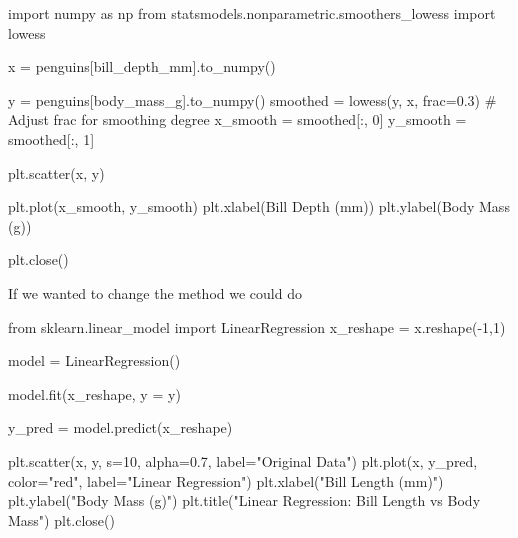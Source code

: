 \documentclass[
  letterpaper,
  DIV=11,
  numbers=noendperiod]{scrreprt}
\newenvironment{Shaded}{\begin{snugshade}}{\end{snugshade}}
\newcommand{\CommentTok}[1]{\textcolor[rgb]{0.37,0.37,0.37}{#1}}
\newcommand{\DecValTok}[1]{\textcolor[rgb]{0.68,0.00,0.00}{#1}}
\newcommand{\FloatTok}[1]{\textcolor[rgb]{0.68,0.00,0.00}{#1}}
\newcommand{\ImportTok}[1]{\textcolor[rgb]{0.00,0.46,0.62}{#1}}
\newcommand{\NormalTok}[1]{\textcolor[rgb]{0.00,0.23,0.31}{#1}}
\newcommand{\OperatorTok}[1]{\textcolor[rgb]{0.37,0.37,0.37}{#1}}
\newcommand{\StringTok}[1]{\textcolor[rgb]{0.13,0.47,0.30}{#1}}
\begin{document}
\begin{Shaded}
\begin{Highlighting}[]
\ImportTok{import}\NormalTok{ numpy }\ImportTok{as}\NormalTok{ np}
\ImportTok{from}\NormalTok{ statsmodels.nonparametric.smoothers\_lowess }\ImportTok{import}\NormalTok{ lowess}

\NormalTok{x }\OperatorTok{=}\NormalTok{ penguins[}\StringTok{\textquotesingle{}bill\_depth\_mm\textquotesingle{}}\NormalTok{].to\_numpy()}

\NormalTok{y }\OperatorTok{=}\NormalTok{ penguins[}\StringTok{\textquotesingle{}body\_mass\_g\textquotesingle{}}\NormalTok{].to\_numpy()}
\NormalTok{smoothed }\OperatorTok{=}\NormalTok{ lowess(y, x, frac}\OperatorTok{=}\FloatTok{0.3}\NormalTok{)  }\CommentTok{\# Adjust \textasciigrave{}frac\textasciigrave{} for smoothing degree}
\NormalTok{x\_smooth }\OperatorTok{=}\NormalTok{ smoothed[:, }\DecValTok{0}\NormalTok{]}
\NormalTok{y\_smooth }\OperatorTok{=}\NormalTok{ smoothed[:, }\DecValTok{1}\NormalTok{]}

\NormalTok{plt.scatter(x, y)}

\NormalTok{plt.plot(x\_smooth, y\_smooth)}
\NormalTok{plt.xlabel(}\StringTok{\textquotesingle{}Bill Depth (mm)\textquotesingle{}}\NormalTok{)}
\NormalTok{plt.ylabel(}\StringTok{\textquotesingle{}Body Mass (g)\textquotesingle{}}\NormalTok{)}

\NormalTok{plt.close()}
\end{Highlighting}
\end{Shaded}

If we wanted to change the method we could do

\begin{Shaded}
\begin{Highlighting}[]
\ImportTok{from}\NormalTok{ sklearn.linear\_model }\ImportTok{import}\NormalTok{ LinearRegression}
\NormalTok{x\_reshape }\OperatorTok{=}\NormalTok{ x.reshape(}\OperatorTok{{-}}\DecValTok{1}\NormalTok{,}\DecValTok{1}\NormalTok{)}

\NormalTok{model }\OperatorTok{=}\NormalTok{ LinearRegression()}

\NormalTok{model.fit(x\_reshape, y }\OperatorTok{=}\NormalTok{ y)}

\NormalTok{y\_pred }\OperatorTok{=}\NormalTok{ model.predict(x\_reshape)}




\NormalTok{plt.scatter(x, y, s}\OperatorTok{=}\DecValTok{10}\NormalTok{, alpha}\OperatorTok{=}\FloatTok{0.7}\NormalTok{, label}\OperatorTok{=}\StringTok{"Original Data"}\NormalTok{)}
\NormalTok{plt.plot(x, y\_pred, color}\OperatorTok{=}\StringTok{"red"}\NormalTok{, label}\OperatorTok{=}\StringTok{"Linear Regression"}\NormalTok{)}
\NormalTok{plt.xlabel(}\StringTok{"Bill Length (mm)"}\NormalTok{)}
\NormalTok{plt.ylabel(}\StringTok{"Body Mass (g)"}\NormalTok{)}
\NormalTok{plt.title(}\StringTok{"Linear Regression: Bill Length vs Body Mass"}\NormalTok{)}
\NormalTok{plt.close()}
\end{Highlighting}
\end{Shaded}
\end{document}
